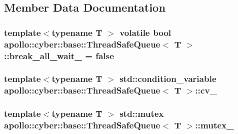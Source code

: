 \subsection{Member Data Documentation}
\hypertarget{classapollo_1_1cyber_1_1base_1_1ThreadSafeQueue_a30e80687183f6d6eab2ec9cb77637666}{
\subsubsection[{break\-\_\-all\-\_\-wait\-\_\-}]{\setlength{\rightskip}{0pt plus 5cm}template$<$typename T $>$ volatile bool {\bf apollo\-::cyber\-::base\-::\-Thread\-Safe\-Queue}$<$ T $>$\-::break\-\_\-all\-\_\-wait\-\_\- = false\hspace{0.3cm}{\ttfamily [private]}}}\label{classapollo_1_1cyber_1_1base_1_1ThreadSafeQueue_a30e80687183f6d6eab2ec9cb77637666}
\hypertarget{classapollo_1_1cyber_1_1base_1_1ThreadSafeQueue_ad75c7d1bbe77c6c19112dee2208e16df}{
\subsubsection[{cv\-\_\-}]{\setlength{\rightskip}{0pt plus 5cm}template$<$typename T $>$ std\-::condition\-\_\-variable {\bf apollo\-::cyber\-::base\-::\-Thread\-Safe\-Queue}$<$ T $>$\-::cv\-\_\-\hspace{0.3cm}{\ttfamily [private]}}}\label{classapollo_1_1cyber_1_1base_1_1ThreadSafeQueue_ad75c7d1bbe77c6c19112dee2208e16df}
\hypertarget{classapollo_1_1cyber_1_1base_1_1ThreadSafeQueue_ada372a404c6d74035a9c603cfe2a004f}{
\subsubsection[{mutex\-\_\-}]{\setlength{\rightskip}{0pt plus 5cm}template$<$typename T $>$ std\-::mutex {\bf apollo\-::cyber\-::base\-::\-Thread\-Safe\-Queue}$<$ T $>$\-::mutex\-\_\-\hspace{0.3cm}{\ttfamily [private]}}}\label{classapollo_1_1cyber_1_1base_1_1ThreadSafeQueue_ada372a404c6d74035a9c603cfe2a004f}
